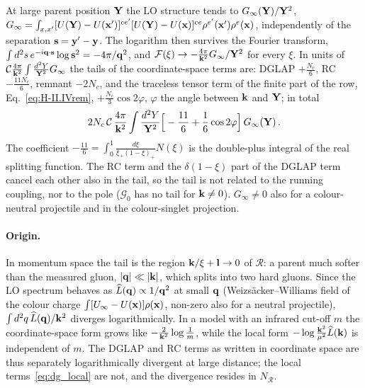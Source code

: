 At large parent position $\mathbf{Y}$ the LO structure tends to $G_\infty(\mathbf{Y})/\mathbf{Y}^2$, $G_\infty=\int_{x,x'}[U(\mathbf{Y})-U(\mathbf{x}')]^{ce'}[U(\mathbf{Y})-U(\mathbf{x})]^{ce}\rho^{e'}(\mathbf{x}')\rho^e(\mathbf{x})$, independently of the separation $\mathbf{s}=\mathbf{y}'-\mathbf{y}$. The logarithm then survives the Fourier transform, $\int d^2s\,e^{-i\mathbf{q}\cdot\mathbf{s}}\log\mathbf{s}^2=-4\pi/\mathbf{q}^2$, and $\mathcal F(\xi)\to-\frac{4\pi}{\mathbf{k}^2}G_\infty/\mathbf{Y}^2$ for every $\xi$. In units of $\mathcal C\frac{4\pi}{\mathbf{k}^2}\int\frac{d^2Y}{\mathbf{Y}^2}G_\infty$ the tails of the coordinate-space terms are: DGLAP $+\frac{N_c}{6}$, RC $-\frac{11N_c}{6}$, remnant $-2N_c$, and the traceless tensor term of the finite part of the row, Eq.~\eqref{eq:H-II.IVrem}, $+\frac{N_c}{3}\cos2\varphi$, $\varphi$ the angle between $\mathbf{k}$ and $\mathbf{Y}$; in total
\begin{align}\label{eq:dg_tailtot}
2N_c\,\mathcal C\,\frac{4\pi}{\mathbf{k}^2}\int\frac{d^2Y}{\mathbf{Y}^2}\Big[-\frac{11}{6}+\frac16\cos2\varphi\Big]\,G_\infty(\mathbf{Y})\,.
\end{align}
The coefficient $-\frac{11}{6}=\int_0^1\frac{d\xi}{\xi_+(1-\xi)_+}N(\xi)$ is the double-plus integral of the real splitting function. The RC term and the $\delta(1-\xi)$ part of the DGLAP term cancel each other also in the tail, so the tail is not related to the running coupling, nor to the pole ($\mathcal G_0$ has no tail for $\mathbf{k}\neq0$). $G_\infty\neq0$ also for a colour-neutral projectile and in the colour-singlet projection.

\paragraph{Origin.} In momentum space the tail is the region $\mathbf{k}/\xi+\mathbf{l}\to0$ of $\mathcal R$: a parent much softer than the measured gluon, $|\mathbf{q}|\ll|\mathbf{k}|$, which splits into two hard gluons. Since the LO spectrum behaves as $\widehat L(\mathbf{q})\propto1/\mathbf{q}^2$ at small $\mathbf{q}$ (Weizs\"acker--Williams field of the colour charge $\int[U_\infty-U(\mathbf{x})]\rho(\mathbf{x})$, non-zero also for a neutral projectile), $\int d^2q\,\widehat L(\mathbf{q})/\mathbf{k}^2$ diverges logarithmically. In a model with an infrared cut-off $m$ the coordinate-space form grows like $-\frac{2}{\mathbf{k}^2}\log\frac1m$, while the local form $-\log\frac{\mathbf{k}^2}{\mu^2}\widehat L(\mathbf{k})$ is independent of $m$. The DGLAP and RC terms as written in coordinate space are thus separately logarithmically divergent at large distance; the local terms~\eqref{eq:dg_local} are not, and the divergence resides in $N_{\mathcal R}$.

